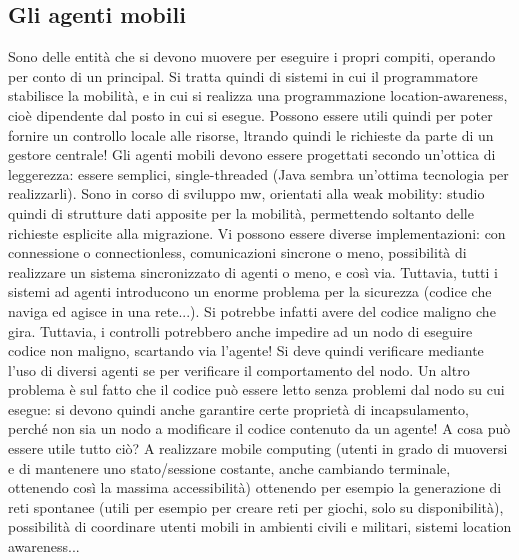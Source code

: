 \subsection{Gli agenti mobili}
Sono delle entità che si devono muovere per eseguire i propri compiti, operando per conto di un principal. Si tratta
quindi di sistemi in cui il programmatore stabilisce la mobilità, e in cui si realizza una programmazione
location-awareness, cioè dipendente dal posto in cui si esegue. Possono essere utili quindi per poter fornire un
controllo locale alle risorse, ltrando quindi le richieste da parte di un gestore centrale! Gli agenti mobili devono
essere progettati secondo un'ottica di leggerezza: essere semplici, single-threaded (Java sembra un'ottima tecnologia
per realizzarli). Sono in corso di sviluppo mw, orientati alla weak mobility:
studio quindi di strutture dati apposite per la mobilità, permettendo soltanto delle richieste esplicite alla
migrazione.
Vi possono essere diverse implementazioni: con connessione o connectionless, comunicazioni sincrone o meno, possibilità
di realizzare un sistema sincronizzato di agenti o meno, e così via. Tuttavia, tutti i sistemi ad agenti introducono un
enorme problema per la sicurezza (codice che naviga ed agisce in una rete...). Si potrebbe infatti avere del codice
maligno che gira. Tuttavia, i controlli potrebbero anche impedire ad un nodo di eseguire codice non maligno, scartando
via l'agente! Si deve quindi verificare mediante l'uso di diversi agenti se per verificare il comportamento del nodo.
Un altro problema è sul fatto che il codice può essere letto senza problemi dal nodo su cui esegue: si devono quindi
anche garantire certe proprietà di incapsulamento, perché non sia un nodo a modificare il codice contenuto da un agente!
A cosa può essere utile tutto ciò? A realizzare mobile computing (utenti in grado di muoversi e di mantenere uno
stato/sessione costante, anche cambiando terminale, ottenendo così la massima accessibilità) ottenendo per esempio la
generazione di reti spontanee (utili per esempio per creare reti per giochi, solo su disponibilità), possibilità di
coordinare utenti mobili in ambienti civili e militari, sistemi location awareness...